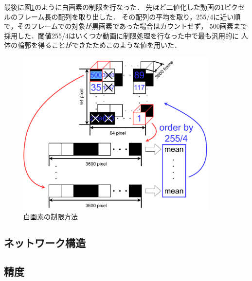 最後に図\ref{choice}のように白画素の制限を行なった．
先ほど二値化した動画の1ピクセルのフレーム長の配列を取り出した．
その配列の平均を取り，255/4に近い順で，そのフレームでの対象が黒画素であった場合はカウントせず，
500画素まで採用した．閾値255/4はいくつか動画に制限処理を行なった中で最も汎用的に
人体の輪郭を得ることができたためこのような値を用いた．

\begin{figure}[b]
  \begin{center}
    \includegraphics[width=100mm]{images/choice.pdf}
  \end{center}
  \caption{白画素の制限方法}
  \label{choice}
\end{figure}

\clearpage

\subsection{ネットワーク構造}

\subsection{精度}